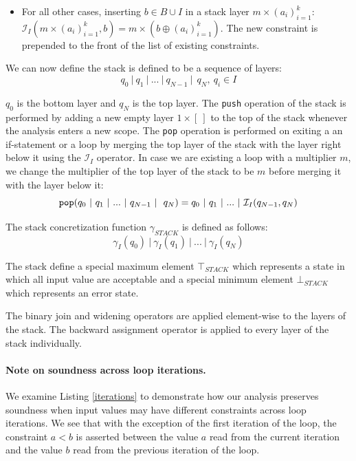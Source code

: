 \documentclass[10pt]{report}
\begin{document}
\begin{itemize}
\begin{itemize}
		\item For all other cases, inserting $ b \in B \cup I$ in a stack layer $ m \times (a_{i})_{i=1}^{k} $: $ \mathcal{I}_{I}(m \times (a_{i})_{i=1}^{k}, b) = m \times (b \oplus (a_{i})_{i=1}^{k})$. The new constraint is prepended to the front of the list of existing constraints. 
	\end{itemize}
\end{itemize}

We can now define the stack is defined to be a sequence of layers: 
$$ q_{0}\ \vert\ q_{1}\ \vert\ ...\ \vert\ q_{N-1}\ \vert\ \ q_{N},\ q_{i} \in I $$

 $ q_{0} $ is the bottom layer and $ q_{N} $ is the top layer. The \verb|push| operation of the stack is performed by adding a new empty layer $ 1 \times [\ ] $ to the top of the stack whenever the analysis enters a new scope. The \verb|pop| operation is performed on exiting a an if-statement or a loop by merging the top layer of the stack with the layer right below it using the $ \mathcal{I}_{I} $ operator. In case we are existing a loop with a multiplier $ m $, we change the multiplier of the top layer of the stack to be $ m $ before merging it with the layer below it: 
 $$ \verb|pop|(q_{0}\ \vert\ q_{1}\ \vert\ ...\ \vert\ q_{N-1}\ \vert\ \ q_{N}) = q_{0}\ \vert\ q_{1}\ \vert\ ...\ \vert\  \mathcal{I}_{I}(q_{N-1}, q_{N}) $$
 
 The stack concretization function $ \gamma_{STACK} $ is defined as follows:\\ $$ \gamma_{I}(q_{0})\ \vert\ \gamma_{I}(q_{1})\ \vert\ ...\ \vert\ \gamma_{I}(q_{N}) $$  
 
 The stack define a special maximum element $ \top_{STACK} $ which represents a state in which all input value are acceptable and a special minimum element $ \bot_{STACK} $ which represents an error state. 
 
 The binary join and widening operators are applied element-wise to the layers of the stack. The backward assignment operator is applied to every layer of the stack individually. 


\paragraph{Note on soundness across loop iterations.}
We examine Listing \ref{iterations} to demonstrate how our analysis preserves soundness when input values may have different constraints across loop iterations. We see that with the exception of the first iteration of the loop, the constraint $ a < b $ is asserted between the value $ a $ read from the current iteration and the value $ b $ read from the previous iteration of the loop. 
\end{document}
